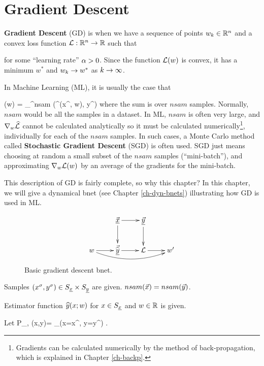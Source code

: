 \chapter{Gradient Descent}
\label{ch-gradient-descent}


{\bf Gradient Descent} (GD) is when we have a sequence of points $w_k\in{ \mathbb{R}}^n$ and a convex loss function ${\cal L}:{ \mathbb{R}}^n\rightarrow { \mathbb{R}}$ such that

\beq
{}
\label{eq-grad-descent}
\eeq
for some \enquote{learning rate} $\alpha>0$.
Since the function ${\cal L}(w)$ is convex, 
it has a minimum $w^*$ and $w_k\rightarrow w^*$
as $k\rightarrow \infty$.

In Machine Learning (ML), it
is usually the case that

\beq
\call(w) = \sum_{}^{nsam}
\HAT{\call}(\haty^\s(x^\s, w), y^\s)
\eeq
where the sum is over $nsam$ samples. Normally, $nsam$ would be 
all the samples in a dataset.
In ML, $nsam$ is often very large, 
and $\nabla_w{\widehat{{\cal L}}} $ cannot
be calculated analytically so it must be calculated numerically\footnote{Gradients can 
be calculated numerically 
by the method of
back-propagation, which is explained in Chapter \ref{ch-backp}.},
individually for each of the $nsam$ samples. In such cases,
a Monte Carlo method called {\bf Stochastic Gradient Descent} (SGD)
is often used. 
SGD just means choosing at random
a small subset of the $nsam$ samples (\enquote{mini-batch}), and
approximating $\nabla_w{\cal L}(w)$ by
an average of the gradients for the mini-batch.

This description of GD is fairly complete, so why this chapter? In this chapter, we will 
give a dynamical bnet (see Chapter \ref{ch-dyn-bnets}) illustrating how GD is used in ML.

\begin{figure}[h!]
\centering
$$\xymatrix{
&\vec{\rvx}\ar[d]\ar[r]&\ul{\vecy}
\ar[d]&\\
w\ar[r]\ar@/_1pc/[rrr]&
\vec{\HAT{\rvy}}\ar[r]&\call\ar[r]&w'
}$$
\caption{Basic gradient descent bnet.}
\label{fig-bfit}
\end{figure}


Samples 
$(x^\sigma, y^\sigma)\in S_{\underline{x}}\times S_{\underline{y}}$
are given. $nsam({\vec{x}})=nsam({\vec{y}})$.

Estimator function 
${\widehat{y}}(x; w)$
for $x\in S_{\underline{x}}$ and $w\in{ \mathbb{R}}$
is given.

Let 
\beq
P_{\rvx, \rvy}(x,y)=
\sum_\s \indi(x=x^\s, y=y^\s)
\;.
\eeq


